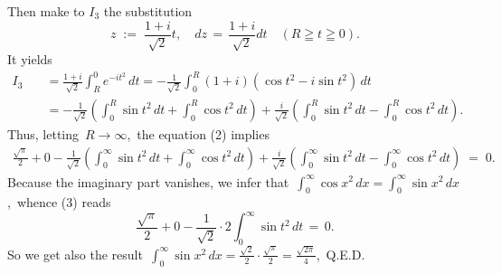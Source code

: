 \documentclass[12pt]{article}
\theoremstyle{definition}
\begin{document}
Then make to $I_3$ the substitution
$$z \;:=\; \frac{1\!+\!i}{\sqrt{2}}t, \quad dz \,=\, \frac{1\!+\!i}{\sqrt{2}}dt \quad(R \geqq t \geqq 0).$$
It yields
\begin{align*}
I_3 &\quad = \frac{1\!+\!i}{\sqrt{2}}\int_R^0e^{-it^2}\,dt
= -\frac{1}{\sqrt{2}}\int_0^R(1+i)(\cos{t^2}-i\sin{t^2})\,dt \\
    &\quad = -\frac{1}{\sqrt{2}}\left(\int_0^R\sin{t^2}\,dt+\int_0^R\cos{t^2}\,dt\right)
+\frac{i}{\sqrt{2}}\left(\int_0^R\sin{t^2}\,dt-\int_0^R\cos{t^2}\,dt\right).
\end{align*}
Thus, letting\, $R \to \infty$,\, the equation (2) implies
\begin{align}
\frac{\sqrt{\pi}}{2}\!+\!0\!
-\frac{1}{\sqrt{2}}\left(\int_0^\infty\!\sin{t^2}\,dt+\!\int_0^\infty\!\cos{t^2}\,dt\right)\!
+\!\frac{i}{\sqrt{2}}\left(\int_0^\infty\!\sin{t^2}\,dt-\!\int_0^\infty\!\cos{t^2}\,dt\right) \;=\; 0.
\end{align}
Because the imaginary part vanishes, we infer that\, $\int_0^\infty\cos{x^2}\,dx = \int_0^\infty\sin{x^2}\,dx$,\, whence (3) reads
$$\frac{\sqrt{\pi}}{2}+0-\frac{1}{\sqrt{2}}\!\cdot\!2\!\int_0^\infty\!\sin{t^2}\,dt \,=\, 0.$$ 
So we get also the result\, $\int_0^\infty\sin{x^2}\,dx = \frac{\sqrt{2}}{2}\cdot\frac{\sqrt{\pi}}{2} = 
\frac{\sqrt{2\pi}}{4}$,\, Q.E.D.


\end{document}
